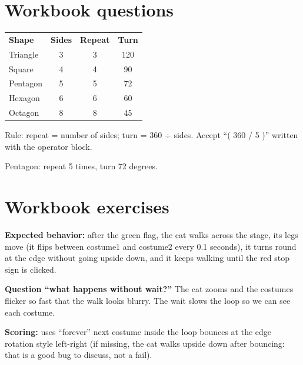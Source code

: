 
\section{Workbook questions}
\begin{answer}
\begin{tabular}{@{}lccc@{}}
\textbf{Shape} & \textbf{Sides} & \textbf{Repeat} & \textbf{Turn} \\
Triangle & 3 & 3 & 120 \\
Square & 4 & 4 & 90 \\
Pentagon & 5 & 5 & 72 \\
Hexagon & 6 & 6 & 60 \\
Octagon & 8 & 8 & 45 \\
\end{tabular}

Rule: repeat = number of sides; turn = 360 ÷ sides. Accept \enquote{( 360 / 5 )} written with the operator block.
\end{answer}

\begin{answer}
Pentagon: repeat 5 times, turn 72 degrees.
\end{answer}

\section{Workbook exercises}
\begin{answer}
\textbf{Expected behavior:} after the green flag, the cat walks across the stage, its legs move (it flips between costume1 and costume2 every 0.1 seconds), it turns round at the edge without going upside down, and it keeps walking until the red stop sign is clicked.

\textbf{Question \enquote{what happens without wait?}} The cat zooms and the costumes flicker so fast that the walk looks blurry. The wait slows the loop so we can see each costume.

\textbf{Scoring:} \tickbox{} uses \enquote{forever} \quad \tickbox{} next costume inside the loop \quad \tickbox{} bounces at the edge \quad \tickbox{} rotation style left-right (if missing, the cat walks upside down after bouncing: that is a good bug to discuss, not a fail).
\end{answer}

